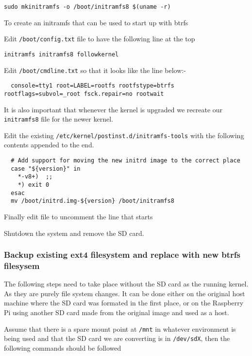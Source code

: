 \documentclass[Draft]{akc}
\begin{document}
\begin{lstlisting}
sudo mkinitramfs -o /boot/initramfs8 $(uname -r)
\end{lstlisting}

To create an initramfs that can be used to start up with btrfs

Edit \texttt{/boot/config.txt} file to have the following line at the top

\begin{lstlisting}
initramfs initramfs8 followkernel
\end{lstlisting}

Edit \texttt{/boot/cmdline.txt} so that it looks like the line below:-

\begin{lstlisting}
  console=tty1 root=LABEL=rootfs rootfstype=btrfs rootflags=subvol=_root fsck.repair=no rootwait
\end{lstlisting}

It is also important that whenever the kernel is upgraded we recreate our \texttt{initramfs8}
file for the newer kernel.

Edit the existing \texttt{/etc/kernel/postinst.d/initramfs-tools} with the
following contents appended to the end.

\begin{lstlisting}
  # Add support for moving the new initrd image to the correct place
  case "${version}" in
    *-v8+)  ;;
    *) exit 0
  esac
  mv /boot/initrd.img-${version} /boot/initramfs8
\end{lstlisting}

Finally edit file  to uncomment the line
that starts 



Shutdown the system and remove the SD card.
\subsubsection{Backup existing ext4 filesystem and replace with new btrfs filesysem}

The following steps need to take place without the SD card as the running kernel. As they are purely
file system changes.  It can be done either on the original host machine where the SD card was
formated in the first place, or on the Raspberry Pi using another SD card made from the original
image and used as a host.

Assume that there is a spare mount point at \texttt{/mnt} in whatever environment is being used and that the
SD card we are converting is in \texttt{/dev/sdX}, then the
following commands should be followed
\end{document}
